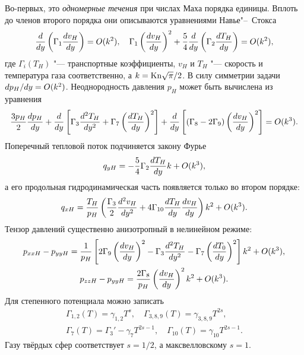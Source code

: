 Во-первых, это \emph{одномерные течения} при числах Маха порядка единицы.
Вплоть до членов второго порядка они описываются уравнениями Навье"--~Стокса
\begin{equation*}
    \der{y}\left(\Gamma_1\der[v_H]{y}\right) = \OO{k^2}, \quad
    \Gamma_1\left(\der[v_H]{y}\right)^2
        + \frac54\der{y}\left(\Gamma_2\der[T_H]{y}\right) = \OO{k^2},
\end{equation*}
где \(\Gamma_i(T_H)\) "--- транспортные коэффициенты,
\(v_H\) и \(T_H\) "--- скорость и температура газа соответственно,
а \(k=\Kn\sqrt\pi/2\).
В силу симметрии задачи \(\Der[p_H]{y}=\OO{k^2}\). Неоднородность давления \(p_H\) может быть вычислена из уравнения
\begin{equation*}
    \frac{3p_H}{2}\der[p_H]{y}
        + \der{y}\left[ \Gamma_3 \derdual[T_H]{y} + \Gamma_7\left(\der[T_H]{y}\right)^2 \right]
        + \der{y}\left[ (\Gamma_8-2\Gamma_9)\left(\der[v_H]{y}\right)^2 \right] = \OO{k^3}.
\end{equation*}
Поперечный тепловой поток подчиняется закону Фурье
\begin{equation*}
    q_{yH} = -\frac54\Gamma_2\der[T_H]{y}k + \OO{k^3},
\end{equation*}
а его продольная гидродинамическая часть появляется только во втором порядке:
\begin{equation*}
    q_{xH} = \frac{T_H}{p_H}\left( \frac{\Gamma_3}2 \derdual[v_H]{y}
        + 4\Gamma_{10} \der[T_H]{y}\der[v_H]{y} \right)k^2 + \OO{k^3}.
\end{equation*}
Тензор давлений существенно анизотропный в нелинейном режиме:
\begin{gather*}
    p_{xxH} - p_{yyH} = \frac1{p_H}\left[
        2\Gamma_9 \left(\der[v_H]{y}\right)^2 - \Gamma_3\derdual[T_H]{y} - \Gamma_7\left(\der[T_0]{y}\right)^2
    \right]k^2 + \OO{k^3}, \\
    p_{zzH} - p_{yyH} = \frac{2\Gamma_8}{p_H}\left(\der[v_H]{y}\right)^2 k^2 + \OO{k^3}.
\end{gather*}
Для степенного потенциала можно записать
\begin{gather*}
    \Gamma_{1,2}(T) = \gamma_{1,2}T^s, \quad \Gamma_{3,8,9}(T) = \gamma_{3,8,9}T^{2s}, \\
    \Gamma_7(T) = \Gamma_3' - \gamma_7T^{2s-1}, \quad \Gamma_{10}(T) = \gamma_{10} T^{2s-1}.
\end{gather*}
Газу твёрдых сфер соответствует \(s=1/2\), а максвелловскому \(s=1\).

